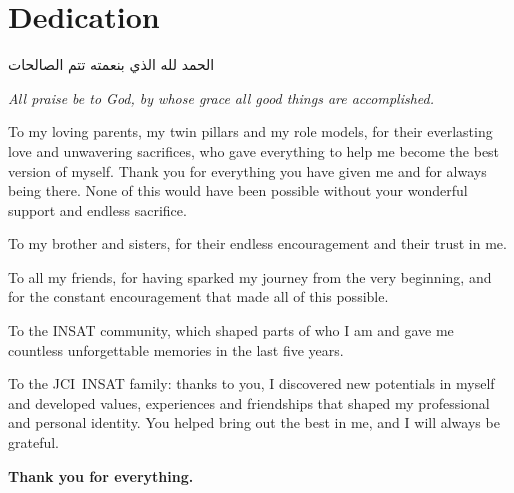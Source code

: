 \chapter*{Dedication}

\begin{center}
\novocalize
\begin{arabtext}
الحمد لله الذي بنعمته تتم الصالحات
\end{arabtext}

\medskip
\textit{All praise be to God, by whose grace all good things are accomplished.}
\end{center}

\vspace{1cm}
\begin{flushright}
\itshape

To my loving parents, my twin pillars and my role models, for their
everlasting love and unwavering sacrifices, who gave everything to help me
become the best version of myself. Thank you for everything you have given
me and for always being there. None of this would have been possible
without your wonderful support and endless sacrifice.

\medskip
To my brother and sisters, for their endless encouragement and their trust
in me.

\medskip
To all my friends, for having sparked my journey from the very
beginning, and for the constant encouragement that made all of this
possible.

\medskip
To the INSAT community, which shaped parts of who I am and gave me
countless unforgettable memories in the last five years.

\medskip
To the JCI~INSAT family: thanks to you, I discovered new potentials in
myself and developed values, experiences and friendships that shaped my professional
and personal identity. You helped bring out the best in me, and I will
always be grateful.

\bigskip
\textbf{Thank you for everything.}

\end{flushright}
\vspace{1cm}
